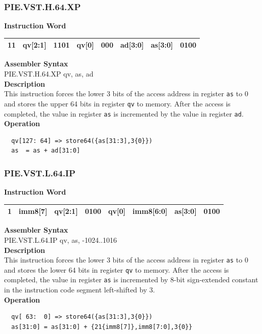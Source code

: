\newpage
\subsubsection{PIE.VST.H.64.XP}\label{instruction:PIEVSTH64XP}
\setlength\tabcolsep{6pt}
\textbf{Instruction Word} \\
\begin{tabular}{|c|c|c|c|c|c|c|c|}
	\hline
	11 & qv[2:1] & 1101 & qv[0] & 000 & ad[3:0] & as[3:0] & 0100 \\
	\hline
\end{tabular}

\textbf{Assembler Syntax} \\
PIE.VST.H.64.XP qv, as, ad \\
\textbf{Description} \\
This instruction forces the lower 3 bits of the access address in register \lstinline{as} to 0 and stores the upper 64 bits in register \lstinline{qv} to memory. After the access is completed, the value in register \lstinline{as} is incremented by the value in register \lstinline{ad}.\\
\textbf{Operation}
\begin{lstlisting}
  qv[127: 64] => store64({as[31:3],3{0}})
  as  = as + ad[31:0]
\end{lstlisting}

\newpage
\subsubsection{PIE.VST.L.64.IP}\label{instruction:PIEVSTL64IP}
\setlength\tabcolsep{6pt}
\textbf{Instruction Word} \\
\begin{tabular}{|c|c|c|c|c|c|c|c|}
	\hline
	1 & imm8[7] & qv[2:1] & 0100 & qv[0] & imm8[6:0] & as[3:0] & 0100 \\
	\hline
\end{tabular}

\textbf{Assembler Syntax} \\
PIE.VST.L.64.IP qv, as, -1024..1016 \\
\textbf{Description} \\
This instruction forces the lower 3 bits of the access address in register \lstinline{as} to 0 and stores the lower 64 bits in register \lstinline{qv} to memory. After the access is completed, the value in register \lstinline{as} is incremented by 8-bit sign-extended constant in the instruction code segment left-shifted by 3.\\
\textbf{Operation}
\begin{lstlisting}
  qv[ 63:  0] => store64({as[31:3],3{0}})
  as[31:0] = as[31:0] + {21{imm8[7]},imm8[7:0],3{0}}
\end{lstlisting}

